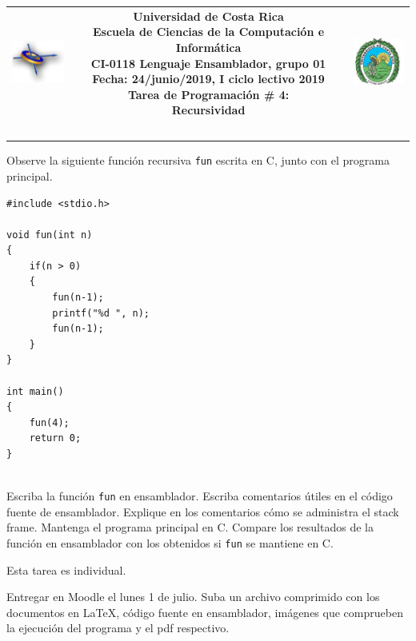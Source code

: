 \documentclass[12pt,letterpaper]{article}
\begin{document}
\begin{tabular}{ccc}
  \includegraphics[width=20mm]{ECCI.jpg}
  \hfill
  & 
  \parbox{5.2in}{ \centering 
                \textbf{Universidad de Costa Rica\\
                Escuela de Ciencias de la Computación e Informática\\
                CI-0118 Lenguaje Ensamblador, grupo 01\\
                Fecha: 24/junio/2019, I ciclo lectivo 2019\\
                \Large Tarea de Programación \# 4:\\
                Recursividad}\\
                \hrulefill
                }  
  & 
  \includegraphics[width=20mm]{UCR.jpg}\\ ~\\
 \end{tabular}
  
 \vspace{1 cm}
 
Observe la siguiente función recursiva \texttt{fun} escrita en C, junto con el programa principal.

\begin{verbatim}
#include <stdio.h> 
  
void fun(int n) 
{ 
    if(n > 0) 
    { 
        fun(n-1); 
        printf("%d ", n); 
        fun(n-1); 
    } 
} 
  
int main() 
{ 
    fun(4); 
    return 0; 
} 
 
\end{verbatim}

Escriba la función \texttt{fun} en ensamblador. Escriba comentarios útiles en el código fuente de ensamblador. Explique en los comentarios cómo se administra el stack frame. Mantenga el programa principal en C. Compare los resultados de la función en ensamblador con los obtenidos si \texttt{fun} se mantiene en C.

Esta tarea es individual.
 
Entregar en Moodle el lunes 1 de julio. Suba un archivo comprimido con los documentos en \LaTeX, código fuente en ensamblador, imágenes que comprueben la ejecución del programa y el pdf respectivo.
\end{document}
